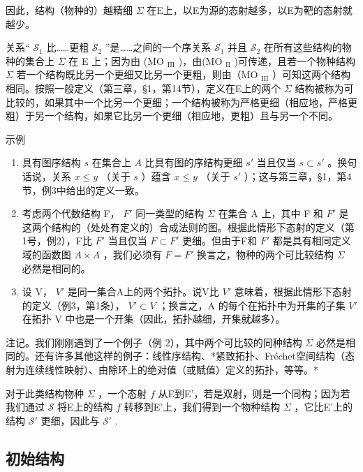 因此，结构（物种的）越精细 \(\Sigma\) 在E上，以E为源的态射越多，以E为靶的态射就越少。

关系“ \(\mathcal{S}_{1}\) 比……更粗 \(\mathcal{S}_{2}\) ”是……之间的一个序关系 \(\mathcal{S}_{1}\) 并且 \(\mathcal{S}_{2}\) 在所有这些结构的物种的集合上 \(\Sigma\) 在 E 上；因为由 (MO \(_{\text{III}}\) )，由(MO \(_{\text{II}}\) )可传递，且若一个物种结构 \(\Sigma\) 若一个结构既比另一个更细又比另一个更粗，则由（MO \(_{\text{III}}\) ）可知这两个结构相同。按照一般定义（第三章，§1，第14节），定义在E上的两个 \(\Sigma\) 结构被称为可比较的，如果其中一个比另一个更细；一个结构被称为严格更细（相应地，严格更粗）于另一个结构，如果它比另一个更细（相应地，更粗）且与另一个不同。

示例

\begin{enumerate}
\def\labelenumi{(\arabic{enumi})}
\item
  具有图序结构 \(s\) 在集合上 \(A\) 比具有图的序结构更细 \(s'\) 当且仅当 \(s \subset s'\) 。换句话说，关系 \(x \leqslant y\) （关于 \(s\) ）蕴含 \(x \leqslant y\) （关于 \(s'\) ）；这与第三章，§1，第4节，例3中给出的定义一致。
\item
  考虑两个代数结构 F， \(F'\) 同一类型的结构 \(\Sigma\) 在集合 A 上，其中 F 和 \(F'\) 是这两个结构的（处处有定义的）合成法则的图。根据此情形下态射的定义（第1号，例2），F比 \(F'\) 当且仅当 \(F \subset F'\) 更细。但由于F和 \(F'\) 都是具有相同定义域的函数图 \(A \times A\) ，我们必须有 \(F = F'\) 换言之，物种的两个可比较结构 \(\Sigma\) 必然是相同的。
\item
  设 V， \(V'\) 是同一集合A上的两个拓扑。说V比 \(V'\) 意味着，根据此情形下态射的定义（例3，第1条）， \(V' \subset V\) ；换言之，A 的每个在拓扑中为开集的子集 \(V'\) 在拓扑 V 中也是一个开集（因此，拓扑越细，开集就越多）。
\end{enumerate}

注记。我们刚刚遇到了一个例子（例 2），其中两个可比较的同种结构 \(\Sigma\) 必然是相同的。还有许多其他这样的例子：线性序结构、*紧致拓扑、Fréchet空间结构（态射为连续线性映射）、由除环上的绝对值（或赋值）定义的拓扑，等等。*

对于此类结构物种 \(\Sigma\) ，一个态射 \(f\) 从E到E'，若是双射，则是一个同构；因为若我们通过 \(\mathcal{S}\) 将E上的结构 \(f\) 转移到E'上，我们得到一个物种结构 \(\Sigma\) ，它比E'上的结构 \(\mathcal{S}'\) 更细，因此与 \(\mathcal{S}'\) .

\subsection{初始结构}

